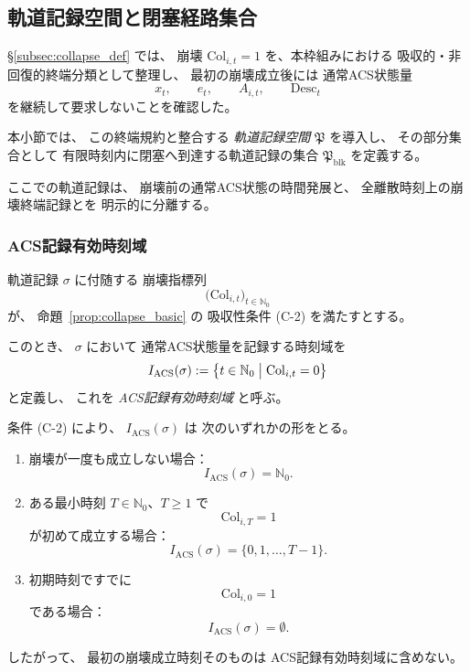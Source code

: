 \subsection{軌道記録空間と閉塞経路集合}
\label{subsec:blk_path_set}

\S\ref{subsec:collapse_def} では、
崩壊
$\mathrm{Col}_{i,t}=1$
を、本枠組みにおける
吸収的・非回復的終端分類として整理し、
最初の崩壊成立後には
通常ACS状態量
\[
  x_t,\qquad
  e_t,\qquad
  A_{i,t},\qquad
  \mathrm{Desc}_t
\]
を継続して要求しないことを確認した。

本小節では、
この終端規約と整合する
\emph{軌道記録空間}
$\mathfrak{P}$ を導入し、
その部分集合として
有限時刻内に閉塞へ到達する軌道記録の集合
$\mathfrak{P}_{\mathrm{blk}}$
を定義する。

ここでの軌道記録は、
崩壊前の通常ACS状態の時間発展と、
全離散時刻上の崩壊終端記録とを
明示的に分離する。

\subsubsection{ACS記録有効時刻域}

\begin{definition}
\label{def:acs_valid_time_domain}
軌道記録 $\sigma$ に付随する
崩壊指標列
\[
  \bigl(
    \mathrm{Col}_{i,t}
  \bigr)_{t\in\mathbb{N}_0}
\]
が、
命題~\ref{prop:collapse_basic} の
吸収性条件 (C-2) を満たすとする。

このとき、
$\sigma$ において
通常ACS状態量を記録する時刻域を
\[
  I_{\mathrm{ACS}}(\sigma)
  :=
  \bigl\{
    t\in\mathbb{N}_0
    \bigm|
    \mathrm{Col}_{i,t}=0
  \bigr\}
\]
と定義し、
これを
\emph{ACS記録有効時刻域}
と呼ぶ。

条件 (C-2) により、
$I_{\mathrm{ACS}}(\sigma)$ は
次のいずれかの形をとる。

\begin{enumerate}
  \item
  崩壊が一度も成立しない場合：
  \[
    I_{\mathrm{ACS}}(\sigma)
    =
    \mathbb{N}_0.
  \]

  \item
  ある最小時刻 $T\in\mathbb{N}_0$、$T\ge1$ で
  \[
    \mathrm{Col}_{i,T}=1
  \]
  が初めて成立する場合：
  \[
    I_{\mathrm{ACS}}(\sigma)
    =
    \{0,1,\ldots,T-1\}.
  \]

  \item
  初期時刻ですでに
  \[
    \mathrm{Col}_{i,0}=1
  \]
  である場合：
  \[
    I_{\mathrm{ACS}}(\sigma)
    =
    \emptyset.
  \]
\end{enumerate}

したがって、
最初の崩壊成立時刻そのものは
ACS記録有効時刻域に含めない。
\end{definition}

